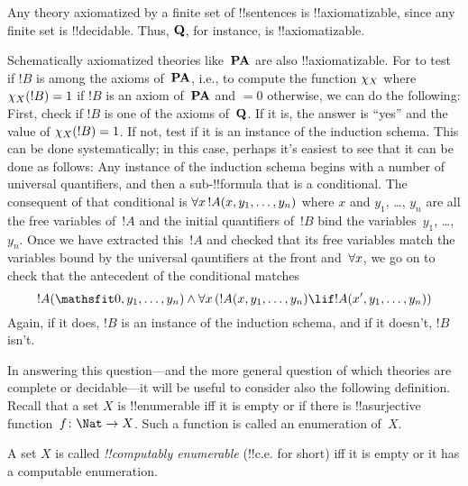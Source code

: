 \documentclass[../../../include/open-logic-section]{subfiles}
\begin{document}
\begin{ex}
Any theory axiomatized by a finite set of !!{sentence}s is
!!{axiomatizable}, since any finite set is !!{decidable}.
Thus, $\mathbf{Q}$, for instance, is !!{axiomatizable}.

Schematically axiomatized theories like~$\mathbf{PA}$ are also
!!{axiomatizable}. For to test if $!B$ is among the axioms
of~$\mathbf{PA}$, i.e., to compute the function $\chi_{X}$ where
$\chi_{X}(!B) = 1$ if $!B$ is an axiom of~$\mathbf{PA}$ and $= 0$
otherwise, we can do the following: First, check if $!B$ is one of the
axioms of~$\mathbf{Q}$. If it is, the answer is ``yes'' and the value of
$\chi_{X}(!B) = 1$. If not, test if it is an instance of the induction
schema.  This can be done systematically; in this case, perhaps it's
easiest to see that it can be done as follows: Any instance of the
induction schema begins with a number of universal quantifiers, and
then a sub-!!{formula} that is a conditional. The consequent of that
conditional is $\lforall[x][!A(x, y_1, \dots, y_n)]$ where $x$ and
$y_1$, \dots, $y_n$ are all the free variables of~$!A$ and the initial
quantifiers of~$!B$ bind the variables~$y_1$, \dots,~$y_n$.  Once we
have extracted this~$!A$ and checked that its free variables match the
variables bound by the universal qauntifiers at the front
and~$\lforall[x]$, we go on to check that the antecedent of the
conditional matches
\[
!A(\Obj 0, y_1, \dots, y_n) \land \lforall[x][(!A(x, y_1, \dots, y_n)
\lif !A(x', y_1, \dots, y_n))]
\]
Again, if it does, $!B$ is an instance of the induction schema, and if
it doesn't, $!B$ isn't.
\end{ex}

In answering this question---and the more general question of which
theories are complete or decidable---it will be useful to consider
also the following definition. Recall that a set $X$ is !!{enumerable}
iff it is empty or if there is !!a{surjective} function~$f \colon \Nat
\to X$. Such a function is called an enumeration of~$X$.

\begin{defn}
A set $X$ is called \emph{!!{computably enumerable}} (!!{c.e.} for
short) iff it is empty or it has a computable enumeration.
\end{defn}
\end{document}
